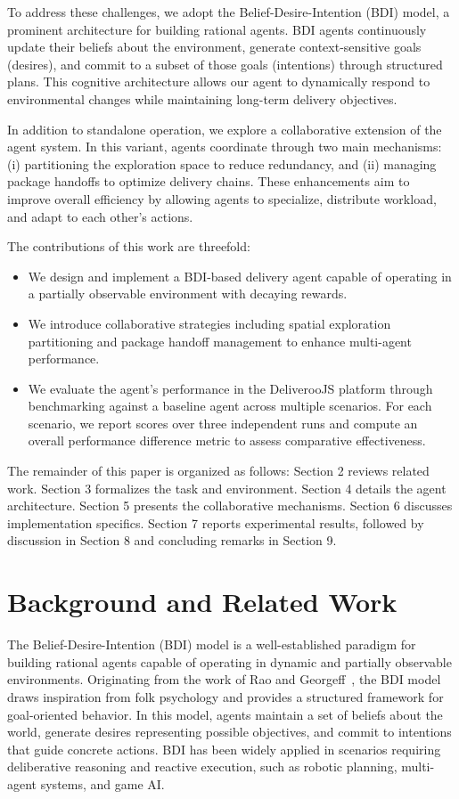 \documentclass[conference]{IEEEtran}
\begin{document}
To address these challenges, we adopt the Belief-Desire-Intention (BDI) model, a prominent architecture for building rational agents. BDI agents continuously update their beliefs about the environment, generate context-sensitive goals (desires), and commit to a subset of those goals (intentions) through structured plans. This cognitive architecture allows our agent to dynamically respond to environmental changes while maintaining long-term delivery objectives.

In addition to standalone operation, we explore a collaborative extension of the agent system. In this variant, agents coordinate through two main mechanisms: (i) partitioning the exploration space to reduce redundancy, and (ii) managing package handoffs to optimize delivery chains. These enhancements aim to improve overall efficiency by allowing agents to specialize, distribute workload, and adapt to each other's actions.

The contributions of this work are threefold:
\begin{itemize}
	\item We design and implement a BDI-based delivery agent capable of operating in a partially observable environment with decaying rewards.
	\item We introduce collaborative strategies including spatial exploration partitioning and package handoff management to enhance multi-agent performance.
	\item We evaluate the agent's performance in the DeliverooJS platform through benchmarking against a baseline agent across multiple scenarios. For each scenario, we report scores over three independent runs and compute an overall performance difference metric to assess comparative effectiveness.
\end{itemize}

The remainder of this paper is organized as follows: Section 2 reviews related work. Section 3 formalizes the task and environment. Section 4 details the agent architecture. Section 5 presents the collaborative mechanisms. Section 6 discusses implementation specifics. Section 7 reports experimental results, followed by discussion in Section 8 and concluding remarks in Section 9.

\section{Background and Related Work}

The Belief-Desire-Intention (BDI) model is a well-established paradigm for building rational agents capable of operating in dynamic and partially observable environments. Originating from the work of Rao and Georgeff~\cite{rao1995bdi}, the BDI model draws inspiration from folk psychology and provides a structured framework for goal-oriented behavior. In this model, agents maintain a set of beliefs about the world, generate desires representing possible objectives, and commit to intentions that guide concrete actions. BDI has been widely applied in scenarios requiring deliberative reasoning and reactive execution, such as robotic planning, multi-agent systems, and game AI.
\end{document}
